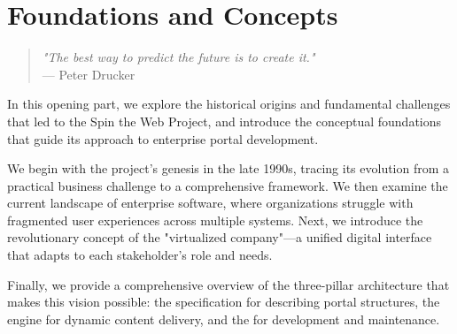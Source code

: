 
\part{Foundations and Concepts}
\label{part:foundations}

\begin{quote}
\textit{"The best way to predict the future is to create it."} \\
— Peter Drucker
\end{quote}

In this opening part, we explore the historical origins and fundamental challenges that led to the Spin the Web Project, and introduce the conceptual foundations that guide its approach to enterprise portal development.

We begin with the project's genesis in the late 1990s, tracing its evolution from a practical business challenge to a comprehensive framework. We then examine the current landscape of enterprise software, where organizations struggle with fragmented user experiences across multiple systems. Next, we introduce the revolutionary concept of the "virtualized company"—a unified digital interface that adapts to each stakeholder's role and needs.

Finally, we provide a comprehensive overview of the three-pillar architecture that makes this vision possible: the \wbdl{} specification for describing portal structures, the \webspinner{} engine for dynamic content delivery, and the \studio{} for development and maintenance.

